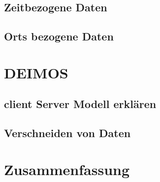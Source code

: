 \documentclass[10pt,conference,compsocconf]{IEEEtran}
\begin{document}
\subsection{Zeitbezogene Daten}

\subsection{Orts bezogene Daten}


\section{DEIMOS}

\subsection{client Server Modell erklären}
%

\subsection{Verschneiden von Daten}


\section{Zusammenfassung}






\end{document}
